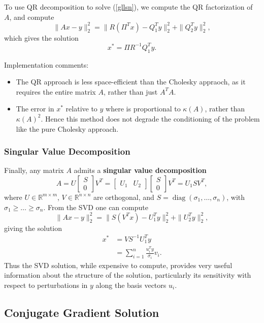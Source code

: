 \documentclass[reqno]{amsart}
\numberwithin{equation}{section}
\begin{document}
To use QR decomposition to solve (\ref{gllsn}), we compute the QR factorization of $A$,
and compute
$$
    \|Ax - y\|_2^2 = \| R(\Pi^Tx) - Q_1^Ty\|_2^2 + \|Q_2^Ty\|_2^2,
$$
which gives the solution
$$
    x^* = \Pi R^{-1} Q_1^Ty.
$$

Implementation comments:
\begin{itemize}
    \item The QR approach is less space-efficient than the Cholesky appraoch, as it requires
        the entire matrix $A$, rather than just $A^TA$.
    \item The error in $x^*$ relative to $y$ where is proportional to $\kappa(A)$,
    rather
    than $\kappa(A)^2$. Hence this method does not degrade the conditioning of the problem like
    the pure Cholesky approach.
\end{itemize}

\subsubsection{Singular Value Decomposition}
Finally, any matrix $A$ admits a \textbf{singular value decomposition}
$$
    A = U \begin{bmatrix} S \\ 0 \end{bmatrix} V^T =
        \begin{bmatrix} U_1 & U_2 \end{bmatrix} \begin{bmatrix} S \\ 0 \end{bmatrix} V^T
        = U_1 S V^T,
$$
where $U \in \mathbb R^{m \times m}$, $V \in \mathbb R^{n \times n}$ are orthogonal,
and $S = \operatorname{diag}(\sigma_1, \ldots, \sigma_n)$, with
$\sigma_1 \ge \ldots \ge \sigma_n$. From the SVD one can compute
$$
    \|Ax - y\|_2^2 = \| S(V^Tx) - U_1^Ty\|_2^2 + \|U_2^Ty\|_2^2,
$$
giving the solution
\begin{align*}
    x^* &= VS^{-1} U_1^Ty \\
        &= \sum_{i=1}^n \frac{u_i^Ty}{\sigma_i} v_i.
\end{align*}
Thus the SVD solution, while expensive to compute, provides very useful information about
the structure of the solution, particularly its
sensitivity with respect to perturbations in $y$ along the basis vectors
$u_i$.

\subsection{Conjugate Gradient Solution}
\end{document}
